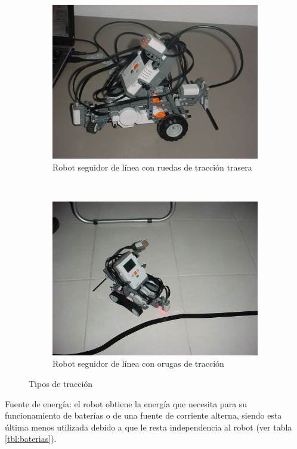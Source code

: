 \documentclass[10pt,letterpaper]{article}
\begin{document}
\begin{figure}
     \centering
     \begin{subfigure}[b]{0.45\textwidth}
             \centering
             \includegraphics[width=0.7\linewidth]{fig/traccion_trasera}
             \caption[Tracción trasera]{Robot seguidor de línea con ruedas de tracción trasera}
             \label{fig:traccion trasera}
     \end{subfigure}%
     ~
     \begin{subfigure}[b]{0.45\textwidth}
             \centering
             \includegraphics[width=0.7\linewidth]{fig/oruga}
             \caption[Orugas de tracción]{Robot seguidor de línea con orugas de tracción}
             \label{fig:oruga}
     \end{subfigure}
     \caption{Tipos de tracción}\label{fig:tracciones}
\end{figure}

Fuente de energía: el robot obtiene la energía que necesita para su funcionamiento de baterías o de una fuente de corriente alterna, siendo esta última menos utilizada debido a que le resta independencia al robot (ver tabla \ref{tbl:baterias}).
\end{document}
